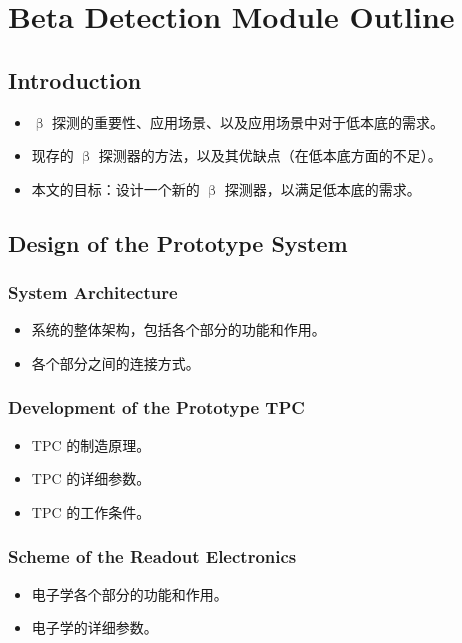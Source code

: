 
\chapter{Beta Detection Module Outline}

\section{Introduction}
\begin{itemize}
    \item $\upbeta$ 探测的重要性、应用场景、以及应用场景中对于低本底的需求。
    \item 现存的 $\upbeta$ 探测器的方法，以及其优缺点（在低本底方面的不足）。
    \item 本文的目标：设计一个新的 $\upbeta$ 探测器，以满足低本底的需求。
\end{itemize}

\section{Design of the Prototype System}
\subsection{System Architecture}
\begin{itemize}
    \item 系统的整体架构，包括各个部分的功能和作用。
    \item 各个部分之间的连接方式。
\end{itemize}

\subsection{Development of the Prototype TPC}
\begin{itemize}
    \item TPC 的制造原理。
    \item TPC 的详细参数。
    \item TPC 的工作条件。
\end{itemize}

\subsection{Scheme of the Readout Electronics}
\begin{itemize}
    \item 电子学各个部分的功能和作用。
    \item 电子学的详细参数。
\end{itemize}

